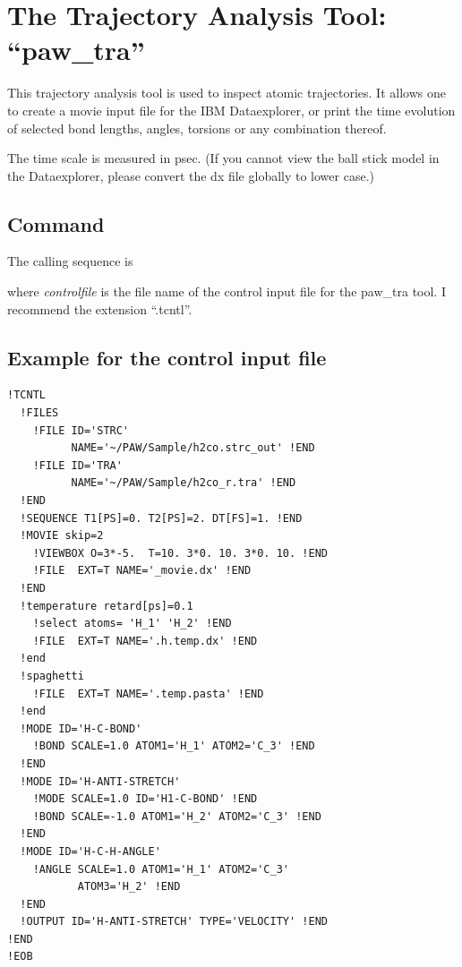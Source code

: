 \documentclass[final,12pt]{article}
\begin{document}
{\section{The Trajectory Analysis Tool: ``paw\_tra''}
This trajectory analysis tool is used to inspect atomic
trajectories. It allows one to create a movie input file for the IBM
Dataexplorer, or print the time evolution of selected bond lengths,
angles, torsions or any combination thereof.

The time scale is measured in psec. (If you cannot view the ball stick
model in the Dataexplorer, please convert the dx file globally to
lower case.)

\subsection{Command}
The calling sequence is

\bigskip{}\bigskip

\noindent
where {\it controlfile} is the file name of the control input file for
the paw\_tra tool. I recommend the extension
``.tcntl''.

\subsection{Example for the control input file}
\begin{verbatim}
!TCNTL
  !FILES
    !FILE ID='STRC' 
          NAME='~/PAW/Sample/h2co.strc_out' !END
    !FILE ID='TRA' 
          NAME='~/PAW/Sample/h2co_r.tra' !END
  !END
  !SEQUENCE T1[PS]=0. T2[PS]=2. DT[FS]=1. !END
  !MOVIE skip=2
    !VIEWBOX O=3*-5.  T=10. 3*0. 10. 3*0. 10. !END
    !FILE  EXT=T NAME='_movie.dx' !END
  !END
  !temperature retard[ps]=0.1
    !select atoms= 'H_1' 'H_2' !END
    !FILE  EXT=T NAME='.h.temp.dx' !END
  !end  
  !spaghetti
    !FILE  EXT=T NAME='.temp.pasta' !END
  !end  
  !MODE ID='H-C-BOND' 
    !BOND SCALE=1.0 ATOM1='H_1' ATOM2='C_3' !END
  !END 
  !MODE ID='H-ANTI-STRETCH' 
    !MODE SCALE=1.0 ID='H1-C-BOND' !END
    !BOND SCALE=-1.0 ATOM1='H_2' ATOM2='C_3' !END
  !END 
  !MODE ID='H-C-H-ANGLE' 
    !ANGLE SCALE=1.0 ATOM1='H_1' ATOM2='C_3' 
           ATOM3='H_2' !END
  !END 
  !OUTPUT ID='H-ANTI-STRETCH' TYPE='VELOCITY' !END
!END
!EOB
\end{verbatim}

}
\end{document}

